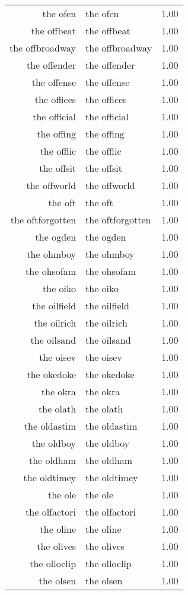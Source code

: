 \begin{table}[ht]
\begin{tabular}{rlr}
  the ofen & the ofen & 1.00 \\ 
  the offbeat & the offbeat & 1.00 \\ 
  the offbroadway & the offbroadway & 1.00 \\ 
  the offender & the offender & 1.00 \\ 
  the offense & the offense & 1.00 \\ 
  the offices & the offices & 1.00 \\ 
  the official & the official & 1.00 \\ 
  the offing & the offing & 1.00 \\ 
  the offlic & the offlic & 1.00 \\ 
  the offsit & the offsit & 1.00 \\ 
  the offworld & the offworld & 1.00 \\ 
  the oft & the oft & 1.00 \\ 
  the oftforgotten & the oftforgotten & 1.00 \\ 
  the ogden & the ogden & 1.00 \\ 
  the ohmboy & the ohmboy & 1.00 \\ 
  the ohsofam & the ohsofam & 1.00 \\ 
  the oiko & the oiko & 1.00 \\ 
  the oilfield & the oilfield & 1.00 \\ 
  the oilrich & the oilrich & 1.00 \\ 
  the oilsand & the oilsand & 1.00 \\ 
  the oisev & the oisev & 1.00 \\ 
  the okedoke & the okedoke & 1.00 \\ 
  the okra & the okra & 1.00 \\ 
  the olath & the olath & 1.00 \\ 
  the oldastim & the oldastim & 1.00 \\ 
  the oldboy & the oldboy & 1.00 \\ 
  the oldham & the oldham & 1.00 \\ 
  the oldtimey & the oldtimey & 1.00 \\ 
  the ole & the ole & 1.00 \\ 
  the olfactori & the olfactori & 1.00 \\ 
  the oline & the oline & 1.00 \\ 
  the olives & the olives & 1.00 \\ 
  the olloclip & the olloclip & 1.00 \\ 
  the olsen & the olsen & 1.00 \\ 

\end{tabular}
\end{table}
